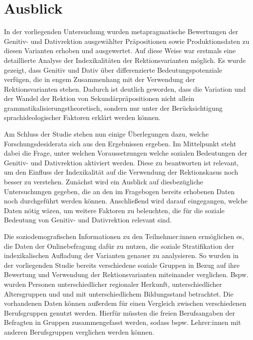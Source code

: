 \chapter{Ausblick}
\label{cha:Ausblick}
In der vorliegenden Untersuchung wurden metapragmatische Bewertungen der Genitiv- und Dativrektion ausgewählter Präpositionen sowie Produktionsdaten zu diesen Varianten erhoben und ausgewertet. 
Auf diese Weise war erstmals eine detaillierte Analyse der Indexikalitäten der Rektionsvarianten möglich. 
Es wurde gezeigt, dass Genitiv und Dativ über differenzierte Bedeutungspotenziale verfügen, die in engem Zusammenhang mit der Verwendung der Rektionsvarianten stehen. 
Dadurch ist deutlich geworden, dass die Variation und der Wandel der Rektion von Sekundärpräpositionen nicht allein grammatikalisierungstheoretisch, sondern nur unter der Berücksichtigung sprachideologischer Faktoren erklärt werden können. 

Am Schluss der Studie stehen nun einige Überlegungen dazu, welche Forschungsdesiderata sich aus den Ergebnissen ergeben. 
Im Mittelpunkt steht dabei die Frage, unter welchen Voraussetzungen welche sozialen Bedeutungen der Genitiv- und Dativrektion aktiviert werden. 
Diese zu beantworten ist relevant, um den Einfluss der Indexikalität auf die Verwendung der Rektionskasus noch besser zu verstehen.  
Zunächst wird ein Ausblick auf diesbezügliche Untersuchungen gegeben, die an den im Fragebogen bereits erhobenen Daten noch durchgeführt werden können. 
Anschließend wird darauf eingegangen, welche Daten nötig wären, um weitere Faktoren zu beleuchten, die für die soziale Bedeutung von Genitiv- und Dativrektion relevant sind. 

Die soziodemografischen Informationen zu den Teilnehmer:innen ermöglichen es, die Daten der Onlinebefragung dafür zu nutzen, die soziale Stratifikation der indexikalischen Aufladung der Varianten genauer zu analysieren. 
So wurden in der vorliegenden Studie bereits verschiedene soziale Gruppen in Bezug auf ihre Bewertung und Verwendung der Rektionsvarianten miteinander verglichen. 
Bspw. wurden Personen unterschiedlicher regionaler Herkunft, unterschiedlicher Altersgruppen und und mit unterschiedlichem Bildungsstand betrachtet. 
Die vorhandenen Daten können außerdem für einen Vergleich zwischen verschiedenen Berufsgruppen genutzt werden. 
Hierfür müssten die freien Berufsangaben der Befragten in Gruppen zusammengefasst werden, sodass bspw. Lehrer:innen mit anderen Berufsgruppen verglichen werden können. 

